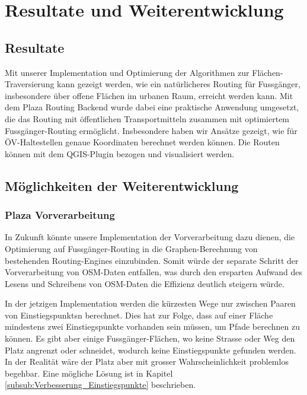 
\section{Resultate und Weiterentwicklung}
\label{sec:Resultate und Weiterentwicklung}

\subsection{Resultate}
\label{sub:Resultate}

Mit unserer Implementation und Optimierung der Algorithmen zur Flächen-Traversierung kann gezeigt werden, wie ein natürlicheres Routing für Fussgänger, insbesondere über offene Flächen im urbanen Raum, erreicht werden kann. Mit dem Plaza Routing Backend wurde dabei eine praktische Anwendung umgesetzt, die das Routing mit öffentlichen Transportmitteln zusammen mit optimiertem Fussgänger-Routing ermöglicht. Insbesondere haben wir Ansätze gezeigt, wie für ÖV-Haltestellen genaue Koordinaten berechnet werden können. Die Routen können mit dem \gls{QGIS}-Plugin bezogen und visualisiert werden.

\subsection{Möglichkeiten der Weiterentwicklung}
\label{sub:Möglichkeiten der Weiterentwicklung}


\subsubsection{Plaza Vorverarbeitung}
\label{subsub:Weiterentwicklung_Vorverarbeitung}

In Zukunft könnte unsere Implementation der Vorverarbeitung dazu dienen, die Optimierung auf Fussgänger-Routing in die Graphen-Berechnung von bestehenden \glspl{Routing-Engine} einzubinden. Somit würde der separate Schritt der Vorverarbeitung von \ac{OSM}-Daten entfallen, was durch den ersparten Aufwand des Lesens und Schreibens von \ac{OSM}-Daten die Effizienz deutlich steigern würde.

In der jetzigen Implementation werden die kürzesten Wege nur zwischen Paaren von \glspl{Einstiegspunkt}n berechnet. Dies hat zur Folge, dass auf einer Fläche mindestens zwei Einstiegspunkte vorhanden sein müssen, um Pfade berechnen zu können. Es gibt aber einige Fussgänger-Flächen, wo keine Strasse oder Weg den Platz angrenzt oder schneidet, wodurch keine Einstiegspunkte gefunden werden. In der Realität wäre der Platz aber mit grosser Wahrscheinlichkeit problemlos begehbar. Eine mögliche Lösung ist in Kapitel \ref{subsub:Verbesserung_Einstiegspunkte} beschrieben.

